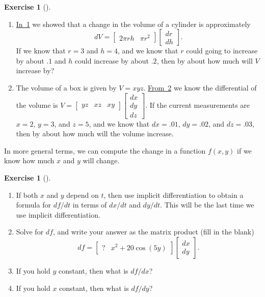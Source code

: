 \documentclass[10pt,]{book}
\theoremstyle{plain}
\theoremstyle{definition}
\theoremstyle{definition}
\theoremstyle{definition}
\theoremstyle{definition}
\newtheorem{exploration}[project]{Exercise}
\theoremstyle{definition}
\numberwithin{equation}{section}
\newcommand{\amp}{&}
\begin{document}
\begin{exploration}[]\label{exploration-133}
\leavevmode%
\begin{enumerate}[font=\bfseries,label=(\alph*),ref=\alph*]
\item\label{task-279} \hyperref[prob_differential_volume_of_a_cylinder]{In~1} we showed that a change in the volume of a cylinder is approximately%
\begin{equation*}
dV = \begin{bmatrix}2\pi rh\amp  \pi r^2
\end{bmatrix} \begin{bmatrix}dr\\dh
\end{bmatrix} .
\end{equation*}
If we know that \(r=3\) and \(h=4\), and we know that \(r\) could going to increase by about \(.1\) and \(h\) could increase by about \(.2\), then by about how much will \(V\) increase by?%
\item\label{task-280} The volume of a box is given by \(V=xyz\). \hyperref[prob_volumebox]{From~2} we know the differential of the volume is \(V=\begin{bmatrix}yz\amp  xz \amp  xy
\end{bmatrix} \begin{bmatrix}dx\\dy\\dz
\end{bmatrix}\). If the current measurements are \(x=2\), \(y=3\), and \(z=5\), and we know that \(dx=.01\), \(dy=.02\), and \(dz=.03\), then by about how much will the volume increase.%
\end{enumerate}
\end{exploration}
In more general terms, we can compute the change in a function \(f(x,y)\) if we know how much \(x\) and \(y\) will change.%
\begin{exploration}[]\label{unit6_content}
\leavevmode%
\begin{enumerate}[font=\bfseries,label=(\alph*),ref=\alph*]
\item\label{task-281} If both \(x\) and \(y\) depend on \(t\), then use implicit differentiation to obtain a formula for \(df/dt\) in terms of \(dx/dt\) and \(dy/dt\). This will be the last time we use implicit differentiation.%
\item\label{task-282} Solve for \(df\), and write your answer as the matrix product (fill in the blank)%
\begin{equation*}
df = \begin{bmatrix}?\amp  x^2+20\cos(5y)
\end{bmatrix} \begin{bmatrix}dx\\dy
\end{bmatrix} .
\end{equation*}
%
\item\label{task-283} If you hold \(y\) constant, then what is \(df/dx\)?%
\item\label{task-284} If you hold \(x\) constant, then what is \(df/dy\)?%
\end{enumerate}
\end{exploration}
\end{document}
